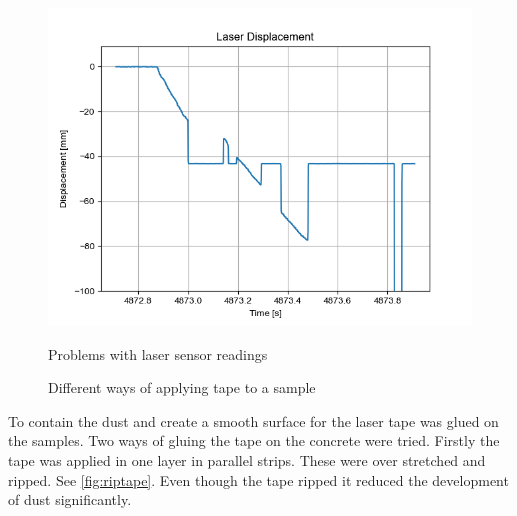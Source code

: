 \begin{figure}
{\includegraphics[width=0.45\linewidth]{pics/weirdlaser.png}} 
\caption{Problems with laser sensor readings} \label{fig:laser} 
\end{figure}

\begin{figure} 
\centering
{}

\caption{Different ways of applying tape to a sample}
\label{fig:beauty_tape}
\end{figure}

To contain the dust and create a smooth surface for the laser tape was glued on the samples. Two ways of gluing the tape on the concrete were tried.
Firstly the tape was applied in one layer in parallel strips. These were over stretched and ripped. See \autoref{fig:riptape}. Even though the tape ripped it reduced the development of dust significantly. 

